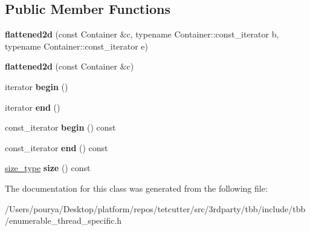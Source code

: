 \subsection*{Public Member Functions}
\begin{DoxyCompactItemize}
\item 
\hypertarget{classtbb_1_1interface6_1_1flattened2d_a96d4bef4d78e9e04f43a4ce0855f2ec7}{}{\bfseries flattened2d} (const Container \&c, typename Container\+::const\+\_\+iterator b, typename Container\+::const\+\_\+iterator e)\label{classtbb_1_1interface6_1_1flattened2d_a96d4bef4d78e9e04f43a4ce0855f2ec7}

\item 
\hypertarget{classtbb_1_1interface6_1_1flattened2d_abcc3a2e4b1eae8ef6ee1dfba8b030680}{}{\bfseries flattened2d} (const Container \&c)\label{classtbb_1_1interface6_1_1flattened2d_abcc3a2e4b1eae8ef6ee1dfba8b030680}

\item 
\hypertarget{classtbb_1_1interface6_1_1flattened2d_a783ca9408f58ca7f5df00bc1035ff6b2}{}iterator {\bfseries begin} ()\label{classtbb_1_1interface6_1_1flattened2d_a783ca9408f58ca7f5df00bc1035ff6b2}

\item 
\hypertarget{classtbb_1_1interface6_1_1flattened2d_ab722e1c2b58641d516cb98b0360b9734}{}iterator {\bfseries end} ()\label{classtbb_1_1interface6_1_1flattened2d_ab722e1c2b58641d516cb98b0360b9734}

\item 
\hypertarget{classtbb_1_1interface6_1_1flattened2d_acf0c0dff2b7b8530f06e6aa22b9a79ea}{}const\+\_\+iterator {\bfseries begin} () const \label{classtbb_1_1interface6_1_1flattened2d_acf0c0dff2b7b8530f06e6aa22b9a79ea}

\item 
\hypertarget{classtbb_1_1interface6_1_1flattened2d_a5b79fe79b6939327ab74628283974226}{}const\+\_\+iterator {\bfseries end} () const \label{classtbb_1_1interface6_1_1flattened2d_a5b79fe79b6939327ab74628283974226}

\item 
\hypertarget{classtbb_1_1interface6_1_1flattened2d_ade48bc8ab723d06790e5d98365e8a4f5}{}\hyperlink{classtbb_1_1interface6_1_1flattened2d_a8b84f8f2cc4499f49d17141eaedc99c0}{size\+\_\+type} {\bfseries size} () const \label{classtbb_1_1interface6_1_1flattened2d_ade48bc8ab723d06790e5d98365e8a4f5}

\end{DoxyCompactItemize}


The documentation for this class was generated from the following file\+:\begin{DoxyCompactItemize}
\item 
/\+Users/pourya/\+Desktop/platform/repos/tetcutter/src/3rdparty/tbb/include/tbb/enumerable\+\_\+thread\+\_\+specific.\+h\end{DoxyCompactItemize}
